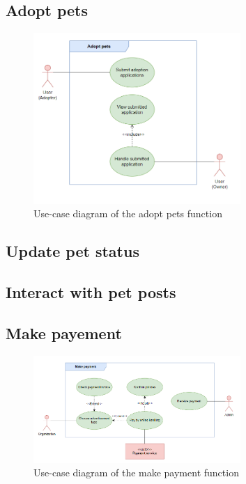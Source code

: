 

\subsection{Adopt pets}

\begin {figure}[H]
\centering
\includegraphics[width=0.7\textwidth]{Figures/adopt_pet_ucd.png}
\caption{Use-case diagram of the adopt pets function}
\label{fig:adopt-pet-activity-diagram}
\end{figure}



\subsection{Update pet status}



\subsection{Interact with pet posts}


\subsection{Make payement}

\begin {figure}[H]
\centering
\includegraphics[width=0.7\textwidth]{Figures/payment_ucd.png}
\caption{Use-case diagram of the make payment function}
\label{fig:payment-activity-diagram}
\end{figure}


